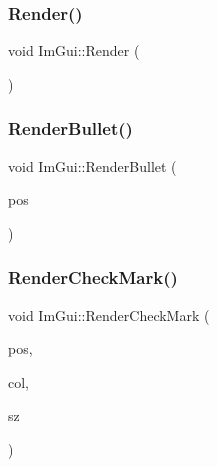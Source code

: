 \hypertarget{namespace_im_gui_ab51a164f547317c16c441f1599e3946d}{}\label{namespace_im_gui_ab51a164f547317c16c441f1599e3946d} 
\subsubsection{\texorpdfstring{Render()}{Render()}}
{\footnotesize\ttfamily void Im\+Gui\+::\+Render (\begin{DoxyParamCaption}{ }\end{DoxyParamCaption})}

\hypertarget{namespace_im_gui_a2d0e4160081b3953fc8f88e2d8e8da15}{}\label{namespace_im_gui_a2d0e4160081b3953fc8f88e2d8e8da15} 
\subsubsection{\texorpdfstring{Render\+Bullet()}{RenderBullet()}}
{\footnotesize\ttfamily void Im\+Gui\+::\+Render\+Bullet (\begin{DoxyParamCaption}\item[{\hyperlink{struct_im_vec2}{Im\+Vec2}}]{pos }\end{DoxyParamCaption})}

\hypertarget{namespace_im_gui_a6adfc430445ed42a65556ffb0d58a8b8}{}\label{namespace_im_gui_a6adfc430445ed42a65556ffb0d58a8b8} 
\subsubsection{\texorpdfstring{Render\+Check\+Mark()}{RenderCheckMark()}}
{\footnotesize\ttfamily void Im\+Gui\+::\+Render\+Check\+Mark (\begin{DoxyParamCaption}\item[{\hyperlink{struct_im_vec2}{Im\+Vec2}}]{pos,  }\item[{Im\+U32}]{col,  }\item[{float}]{sz }\end{DoxyParamCaption})}

\hypertarget{namespace_im_gui_a4715686ee0c613e8518c0f5e92c358ce}{}\label{namespace_im_gui_a4715686ee0c613e8518c0f5e92c358ce} 
